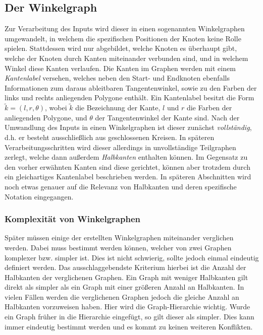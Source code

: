 \subsection{Der Winkelgraph}
\label{chap:winkelgraph}
Zur Verarbeitung des Inputs wird dieser in einen sogenannten Winkelgraphen umgewandelt, in welchem die spezifischen Positionen der Knoten
keine Rolle spielen. Stattdessen wird nur abgebildet, welche Knoten es überhaupt gibt, welche der Knoten durch Kanten miteinander verbunden
sind, und in welchem Winkel diese Kanten verlaufen.
Die Kanten im Graphen werden mit einem \textit{Kantenlabel} versehen, welches neben den Start- und Endknoten ebenfalls Informationen zum
daraus ableitbaren Tangentenwinkel, sowie zu den Farben der links und rechts anliegenden Polygone enthält. Ein Kantenlabel besitzt die Form
\(\tilde{k} = (l,r,\theta)\), wobei \(\tilde{k}\) die Bezeichnung der Kante, \(l\) und \(r\) die Farben der anliegenden Polygone, und
\(\theta\) der Tangentenwinkel der Kante sind.
Nach der Umwandlung des Inputs in einen Winkelgraphen ist dieser zunächst \textit{vollständig}, d.h. er besteht ausschließlich aus
geschlossenen Kreisen. In späteren Verarbeitungsschritten wird dieser allerdings in unvollständige Teilgraphen zerlegt, welche dann außerdem
\textit{Halbkanten} enthalten können. Im Gegensatz zu den vorher erwähnten Kanten sind diese gerichtet, können aber trotzdem durch ein
gleichartiges Kantenlabel beschrieben werden. In späteren Abschnitten wird noch etwas genauer auf die Relevanz von Halbkanten und deren
spezifische Notation eingegangen.

\subsubsection{Komplexität von Winkelgraphen}
Später müssen einige der erstellten Winkelgraphen miteinander verglichen werden. Dabei muss bestimmt werden können, welcher
von zwei Graphen komplexer bzw. simpler ist. Dies ist nicht schwierig, sollte jedoch einmal eindeutig definiert werden. Das ausschlaggebendste
Kriterium hierbei ist die Anzahl der Halbkanten der verglichenen Graphen. Ein Graph mit weniger
Halbkanten gilt direkt als simpler als ein Graph mit einer größeren Anzahl an Halbkanten. In vielen Fällen werden die verglichenen Graphen jedoch die gleiche Anzahl
an Halbkanten vorzuweisen haben. Hier wird die Graph-Hierarchie wichtig. Wurde ein Graph früher in die Hierarchie eingefügt, so gilt dieser als
simpler. Dies kann immer eindeutig bestimmt werden und es kommt zu keinen weiteren Konflikten.

